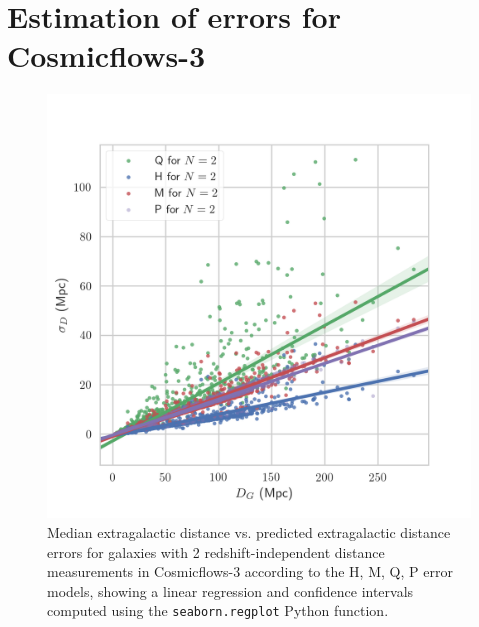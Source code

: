 \documentclass[a4paper,fleqn,usenatbib]{mnras}
\begin{document}
\section{Estimation of errors for Cosmicflows-3}
\begin{figure}
	\includegraphics[scale=0.7]{CF3low.png}
    \caption{Median extragalactic distance vs. predicted extragalactic distance errors for galaxies with 2 redshift-independent distance measurements in Cosmicflows-3 according to the H, M, Q, P error models, showing a linear regression and confidence intervals computed using the \texttt{seaborn.regplot} Python function.}
    \label{fig:CF3low}
\end{figure}
\end{document}
